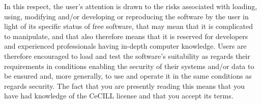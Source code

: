 In this respect, the user's attention is drawn to the risks associated with loading, using, modifying and/or developing or reproducing the software by the user in light of its specific status of free software, that may mean that it is complicated to manipulate, and that also therefore means that it is reserved for developers and experienced professionals having in-depth computer knowledge. Users are therefore encouraged to load and test the software's suitability as regards their requirements in conditions enabling the security of their systems and/or data to be ensured and, more generally, to use and operate it in the same conditions as regards security. The fact that you are presently reading this means that you have had knowledge of the Ce\-CILL license and that you accept its terms. 